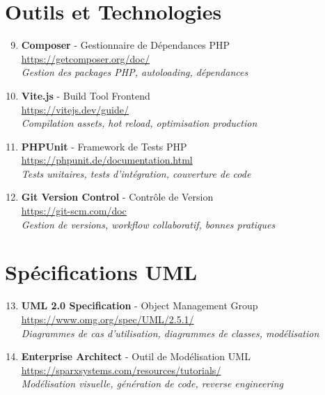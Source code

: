 \documentclass[12pt, a4paper, twoside, openany]{report}
\begin{document}
\section*{Outils et Technologies}

\begin{enumerate}
    \setcounter{enumi}{8}
    \item \textbf{Composer} - Gestionnaire de Dépendances PHP \\
    \url{https://getcomposer.org/doc/} \\
    \textit{Gestion des packages PHP, autoloading, dépendances}
    
    \item \textbf{Vite.js} - Build Tool Frontend \\
    \url{https://vitejs.dev/guide/} \\
    \textit{Compilation assets, hot reload, optimisation production}
    
    \item \textbf{PHPUnit} - Framework de Tests PHP \\
    \url{https://phpunit.de/documentation.html} \\
    \textit{Tests unitaires, tests d'intégration, couverture de code}
    
    \item \textbf{Git Version Control} - Contrôle de Version \\
    \url{https://git-scm.com/doc} \\
    \textit{Gestion de versions, workflow collaboratif, bonnes pratiques}
\end{enumerate}

\section*{Spécifications UML}

\begin{enumerate}
    \setcounter{enumi}{12}
    \item \textbf{UML 2.0 Specification} - Object Management Group \\
    \url{https://www.omg.org/spec/UML/2.5.1/} \\
    \textit{Diagrammes de cas d'utilisation, diagrammes de classes, modélisation}
    
    \item \textbf{Enterprise Architect} - Outil de Modélisation UML \\
    \url{https://sparxsystems.com/resources/tutorials/} \\
    \textit{Modélisation visuelle, génération de code, reverse engineering}
\end{enumerate}
\end{document}
